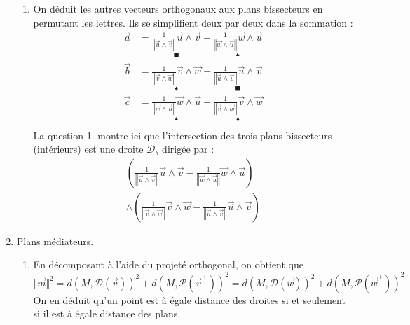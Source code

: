\begin{enumerate}
\begin{enumerate}
\item On déduit les autres vecteurs orthogonaux aux plans bissecteurs en permutant les lettres. Ils se simplifient deux par deux dans la sommation :
\begin{align*}
 \overrightarrow a &=
\underset{\blacksquare}{\frac{1}{\left\Vert \overrightarrow u \wedge \overrightarrow v \right\Vert}\overrightarrow u \wedge \overrightarrow v }
-\underset{\blacktriangle}{\frac{1}{\left\Vert \overrightarrow w \wedge \overrightarrow u \right\Vert}\overrightarrow w \wedge \overrightarrow u} \\
 \overrightarrow b &=
\underset{\blacklozenge}{\frac{1}{\left\Vert \overrightarrow v \wedge \overrightarrow w \right\Vert}\overrightarrow v \wedge \overrightarrow w }
-\underset{\blacksquare}{\frac{1}{\left\Vert \overrightarrow u \wedge \overrightarrow v \right\Vert}\overrightarrow u \wedge \overrightarrow v} \\
 \overrightarrow c &=
\underset{\blacktriangle}{\frac{1}{\left\Vert \overrightarrow w \wedge \overrightarrow u \right\Vert}\overrightarrow w \wedge \overrightarrow u }
-\underset{\blacklozenge}{\frac{1}{\left\Vert \overrightarrow v \wedge \overrightarrow w \right\Vert}\overrightarrow v \wedge \overrightarrow w} \\
\end{align*}
La question 1. montre ici que l'intersection des trois plans bissecteurs (intérieurs) est une droite $\mathcal D_b$ dirigée par :
\begin{multline*}
 \left(
\frac{1}{\left\Vert \overrightarrow u \wedge \overrightarrow v \right\Vert}\overrightarrow u \wedge \overrightarrow v 
-
\frac{1}{\left\Vert \overrightarrow w \wedge \overrightarrow u \right\Vert}\overrightarrow w \wedge \overrightarrow u
\right)  \\
\wedge 
\left( 
\frac{1}{\left\Vert \overrightarrow v \wedge \overrightarrow w \right\Vert}\overrightarrow v \wedge \overrightarrow w
-
\frac{1}{\left\Vert \overrightarrow u \wedge \overrightarrow v \right\Vert}\overrightarrow u \wedge \overrightarrow v
\right) 
\end{multline*}
\end{enumerate}

\item Plans \og médiateurs\fg.
\begin{enumerate}
 \item En décomposant à l'aide du projeté orthogonal, on obtient que
\begin{displaymath}
 \Vert \overrightarrow m \Vert ^2
 = d(M,\mathcal D(\overrightarrow v))^2 +d(M,\mathcal P(\overrightarrow v ^\bot))^2 
 = d(M,\mathcal D(\overrightarrow w))^2 +d(M,\mathcal P(\overrightarrow w ^\bot))^2
\end{displaymath}
On en déduit qu'un point est à égale distance des droites si et seulement si il est à égale distance des plans.


\end{enumerate}
\end{enumerate}

